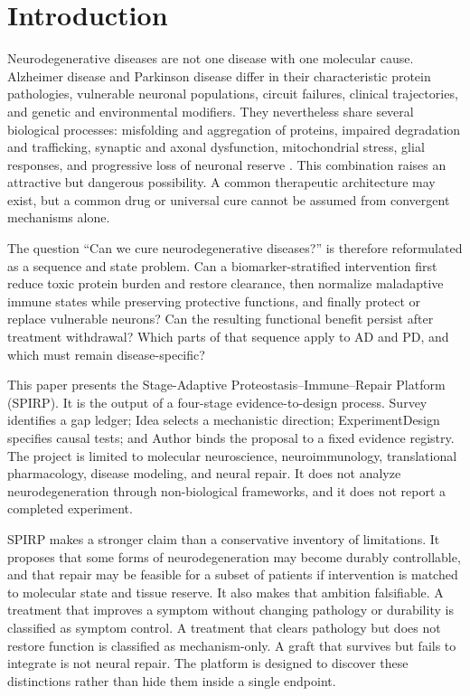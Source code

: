 \documentclass[conference]{IEEEtran}
\begin{document}
\section{Introduction}
Neurodegenerative diseases are not one disease with one molecular cause. Alzheimer disease and Parkinson disease differ in their characteristic protein pathologies, vulnerable neuronal populations, circuit failures, clinical trajectories, and genetic and environmental modifiers. They nevertheless share several biological processes: misfolding and aggregation of proteins, impaired degradation and trafficking, synaptic and axonal dysfunction, mitochondrial stress, glial responses, and progressive loss of neuronal reserve \cite{selkoe2016,poewe2017,bloem2021}. This combination raises an attractive but dangerous possibility. A common therapeutic architecture may exist, but a common drug or universal cure cannot be assumed from convergent mechanisms alone.

The question ``Can we cure neurodegenerative diseases?'' is therefore reformulated as a sequence and state problem. Can a biomarker-stratified intervention first reduce toxic protein burden and restore clearance, then normalize maladaptive immune states while preserving protective functions, and finally protect or replace vulnerable neurons? Can the resulting functional benefit persist after treatment withdrawal? Which parts of that sequence apply to AD and PD, and which must remain disease-specific?

This paper presents the Stage-Adaptive Proteostasis--Immune--Repair Platform (SPIRP). It is the output of a four-stage evidence-to-design process. Survey identifies a gap ledger; Idea selects a mechanistic direction; ExperimentDesign specifies causal tests; and Author binds the proposal to a fixed evidence registry. The project is limited to molecular neuroscience, neuroimmunology, translational pharmacology, disease modeling, and neural repair. It does not analyze neurodegeneration through non-biological frameworks, and it does not report a completed experiment.

SPIRP makes a stronger claim than a conservative inventory of limitations. It proposes that some forms of neurodegeneration may become durably controllable, and that repair may be feasible for a subset of patients if intervention is matched to molecular state and tissue reserve. It also makes that ambition falsifiable. A treatment that improves a symptom without changing pathology or durability is classified as symptom control. A treatment that clears pathology but does not restore function is classified as mechanism-only. A graft that survives but fails to integrate is not neural repair. The platform is designed to discover these distinctions rather than hide them inside a single endpoint.
\end{document}
